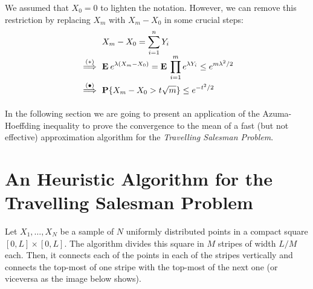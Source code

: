 \begin{remark} We assumed that $X_0 = 0$ to lighten the notation. However, we can remove this restriction by replacing $X_m$ with $X_m - X_0$ in some crucial steps:
    \[\everymath{\displaystyle}\arraycolsep=1.8pt\def\arraystretch{1.8}
        \begin{array}{rl}
            & X_m-X_0 = \sum_{i = 1}^n Y_i\\
            \overset{(*)}{\implies} & \E e^{\lambda (X_m-X_0)} = \E \prod_{i = 1}^{m} e^{\lambda Y_i} \leq e^{m \lambda^2 / 2}\\
            \overset{(\bullet)}{\implies} & \P\{X_m-X_0 > t\sqrt{m}\} \leq e^{-t^2/2}
        \end{array} 
        \] 

\end{remark}    

In the following section we are going to present an application of the Azuma-Hoeffding inequality to prove the convergence to the mean of a fast (but not effective) approximation algorithm for the \textit{Travelling Salesman Problem}. 

\section{An Heuristic Algorithm for the Travelling Salesman Problem}

Let $X_1,\ldots, X_N$ be a sample of $N$ uniformly distributed points in a compact square $[0,L]\times [0,L]$. The algorithm divides this square in $M$ stripes of width $L/M$ each. Then, it connects each of the points in each of the stripes vertically and connects the top-most of one stripe with the top-most of the next one (or viceversa as the image below shows).

